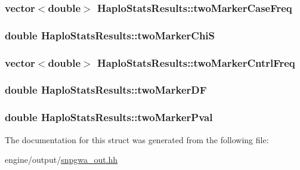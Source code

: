 \label{structHaploStatsResults_aeb730deb184f94c39b9f818da4a7752d}
\hypertarget{structHaploStatsResults_a2270d7ae0d0346b8ed09c4a19d45615d}{
\subsubsection[{twoMarkerCaseFreq}]{\setlength{\rightskip}{0pt plus 5cm}vector$<$double$>$ {\bf HaploStatsResults::twoMarkerCaseFreq}}}
\label{structHaploStatsResults_a2270d7ae0d0346b8ed09c4a19d45615d}
\hypertarget{structHaploStatsResults_aa8d4b951c0998e3f5da959dcb38f6f3c}{
\subsubsection[{twoMarkerChiS}]{\setlength{\rightskip}{0pt plus 5cm}double {\bf HaploStatsResults::twoMarkerChiS}}}
\label{structHaploStatsResults_aa8d4b951c0998e3f5da959dcb38f6f3c}
\hypertarget{structHaploStatsResults_a87d2f0dfa6dc45c299aace3d59b00bda}{
\subsubsection[{twoMarkerCntrlFreq}]{\setlength{\rightskip}{0pt plus 5cm}vector$<$double$>$ {\bf HaploStatsResults::twoMarkerCntrlFreq}}}
\label{structHaploStatsResults_a87d2f0dfa6dc45c299aace3d59b00bda}
\hypertarget{structHaploStatsResults_a622dc51cdb7538b550713ccc4e63386c}{
\subsubsection[{twoMarkerDF}]{\setlength{\rightskip}{0pt plus 5cm}double {\bf HaploStatsResults::twoMarkerDF}}}
\label{structHaploStatsResults_a622dc51cdb7538b550713ccc4e63386c}
\hypertarget{structHaploStatsResults_a294f5a3a746c5e7d4fd65afd76ae1bdf}{
\subsubsection[{twoMarkerPval}]{\setlength{\rightskip}{0pt plus 5cm}double {\bf HaploStatsResults::twoMarkerPval}}}
\label{structHaploStatsResults_a294f5a3a746c5e7d4fd65afd76ae1bdf}


The documentation for this struct was generated from the following file:\begin{DoxyCompactItemize}
\item 
engine/output/\hyperlink{snpgwa__out_8hh}{snpgwa\_\-out.hh}\end{DoxyCompactItemize}
